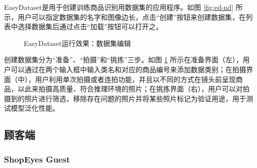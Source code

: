 EasyDataset是用于创建训练商品识别用数据集的应用程序。如图 \ref{fig:ed-nd} 所示，用户可以指定数据集的名字和图像边长，点击“创建”按钮来创建数据集，在列表中选择数据集后通过点击“加载”按钮可以打开之。

\begin{figure}[htbp]
    \centering
    \hfill
    \hfill
	\caption{EasyDataset运行效果：数据集编辑}
	\label{fig:ed-edit}
\end{figure}

创建数据集分为“准备”、“拍摄”和“挑拣”三步。如图 \ref{fig:ed-edit} 所示在准备界面（左），用户可以通过在两个输入框中输入类名和对应的商品编号来添加数据类别；在拍摄界面（中），用户利用单次拍摄或者连拍功能，并且以不同的方式在镜头前呈现商品，以此来拍摄高质量、符合推理环境的照片；在挑拣界面（右），用户可以对拍摄到的照片进行筛选，移除存在问题的照片并将某些照片标记为验证用途，用于测试模型泛化性能。

\subsection{顾客端}

\subsubsection{ShopEyes Guest}

